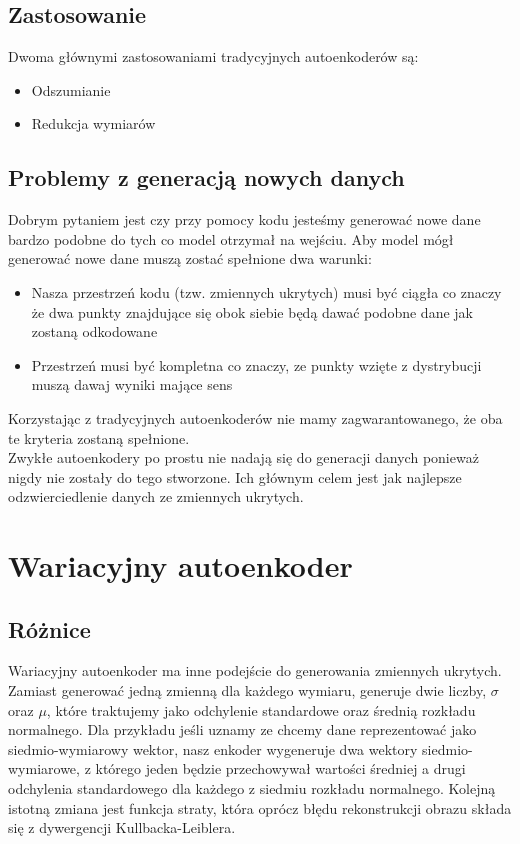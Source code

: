 \documentclass[a4paper,12pt]{book} %
\begin{document}
\subsection{Zastosowanie}
Dwoma głównymi zastosowaniami tradycyjnych autoenkoderów są:
\begin{itemize}
	\item Odszumianie
	\item Redukcja wymiarów 
\end{itemize}
\subsection{Problemy z generacją nowych danych}
Dobrym pytaniem jest czy przy pomocy kodu jesteśmy generować nowe dane bardzo podobne do tych co model otrzymał na wejściu. Aby model mógł generować nowe dane muszą zostać spełnione dwa warunki:
\begin{itemize}
	\item Nasza przestrzeń kodu (tzw. zmiennych ukrytych) musi być ciągła co znaczy że dwa punkty znajdujące się obok siebie będą dawać podobne dane jak zostaną odkodowane
	\item Przestrzeń musi być kompletna co znaczy, ze punkty wzięte z dystrybucji muszą dawaj wyniki mające sens
\end{itemize}
Korzystając z tradycyjnych autoenkoderów nie mamy zagwarantowanego, że oba te kryteria zostaną spełnione.\\

Zwykłe autoenkodery po prostu nie nadają się do generacji danych ponieważ nigdy nie zostały do tego stworzone. Ich głównym celem jest jak najlepsze odzwierciedlenie danych ze zmiennych ukrytych. 
\section{Wariacyjny autoenkoder}
\subsection{Różnice}
Wariacyjny autoenkoder ma inne podejście do generowania zmiennych ukrytych. Zamiast generować jedną zmienną dla każdego wymiaru, generuje dwie liczby, $\sigma$ oraz $\mu$, które traktujemy jako odchylenie standardowe oraz średnią rozkładu normalnego.
Dla przykładu jeśli uznamy ze chcemy dane reprezentować jako siedmio-wymiarowy wektor, nasz enkoder wygeneruje dwa wektory siedmio-wymiarowe, z którego jeden będzie przechowywał wartości średniej a drugi odchylenia standardowego dla każdego z siedmiu rozkładu normalnego. Kolejną istotną zmiana jest funkcja straty, która oprócz błędu rekonstrukcji obrazu składa się z dywergencji Kullbacka-Leiblera.\\
\end{document}

